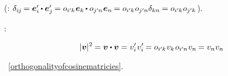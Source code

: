 \vspace{-0.2em} \noindent (:
$\delta_{i\hspace{-0.1ex}j} \hspace{-0.2ex}
= \bm{e}'_i \hspace{-0.12ex} \dotp \bm{e}'_j \hspace{-0.16ex}
= \cosinematrix{i'\hspace{-0.1ex}k} \hspace{.1ex} \bm{e}_k \hspace{-0.15ex} \dotp \cosinematrix{j'\hspace{-0.1ex}n} \hspace{.1ex} \bm{e}_n \hspace{-0.16ex}
= \cosinematrix{i'\hspace{-0.1ex}k} \hspace{.1ex} \cosinematrix{j'\hspace{-0.1ex}n} \delta_{kn} \hspace{-0.12ex}
= \cosinematrix{i'\hspace{-0.1ex}k} \hspace{.1ex} \cosinematrix{j'\hspace{-0.1ex}k} \hspace{0.1ex}$).

     :

\nopagebreak \vspace{-0.25em} \begin{equation*}
|\bm{v}|^2 \hspace{-0.1ex} = \bm{v} \dotp \bm{v}
= v'_i \hspace{.2ex} v'_i \hspace{-0.16ex}
= \cosinematrix{i'\hspace{-0.1ex}k} \hspace{.1ex} v_k \hspace{.2ex} \cosinematrix{i'\hspace{-0.1ex}n} \hspace{.1ex} v_n \hspace{-0.16ex}
= v_n v_n
\end{equation*}

\vspace{-0.25em} \noindent
{}~\eqref{orthogonalityofcosinematricies}.

